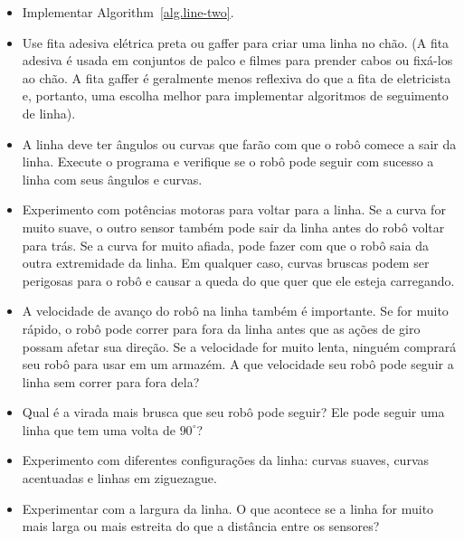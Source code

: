 \begin{framed}
\begin{itemize}
\item Implementar Algorithm~\ref{alg.line-two}.
\item Use fita adesiva elétrica preta ou gaffer para criar uma linha no chão. (A fita adesiva é usada em conjuntos de palco e filmes para prender cabos ou fixá-los ao chão. A fita gaffer é geralmente menos reflexiva do que a fita de eletricista e, portanto, uma escolha melhor para implementar algoritmos de seguimento de linha).
\item A linha deve ter ângulos ou curvas que farão com que o robô comece a sair da linha. Execute o programa e verifique se o robô pode seguir com sucesso a linha com seus ângulos e curvas.
\item Experimento com potências motoras para voltar para a linha. Se a curva for muito suave, o outro sensor também pode sair da linha antes do robô voltar para trás. Se a curva for muito afiada, pode fazer com que o robô saia da outra extremidade da linha. Em qualquer caso, curvas bruscas podem ser perigosas para o robô e causar a queda do que quer que ele esteja carregando.
\item A velocidade de avanço do robô na linha também é importante. Se for muito rápido, o robô pode correr para fora da linha antes que as ações de giro possam afetar sua direção. Se a velocidade for muito lenta, ninguém comprará seu robô para usar em um armazém. A que velocidade seu robô pode seguir a linha sem correr para fora dela?
\end{itemize}
\end{framed}

\begin{framed}
\begin{itemize}
\item Qual é a virada mais brusca que seu robô pode seguir? Ele pode seguir uma linha que tem uma volta de $90^\circ{}$?
\item Experimento com diferentes configurações da linha: curvas suaves, curvas acentuadas e linhas em ziguezague.
\item Experimentar com a largura da linha. O que acontece se a linha for muito mais larga ou mais estreita do que a distância entre os sensores?
\end{itemize}
\end{framed}

